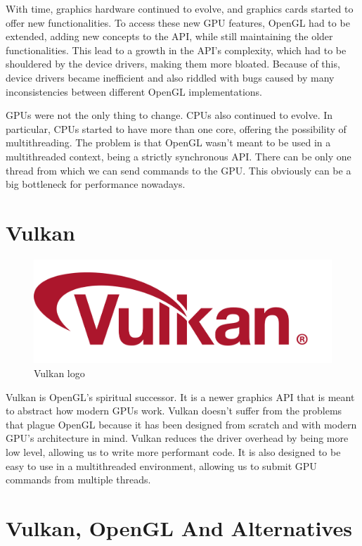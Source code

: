 With time, graphics hardware continued to evolve, and graphics cards started
to offer new functionalities.
To access these new GPU features, OpenGL had to be extended, adding new
concepts to the API, while still maintaining the older functionalities.
This lead to a growth in the API's complexity, which had to be shouldered by
the device drivers, making them more bloated.
Because of this, device drivers became inefficient and also riddled with bugs
caused by many inconsistencies between different OpenGL implementations.

GPUs were not the only thing to change.
CPUs also continued to evolve.
In particular, CPUs started to have more than one core, offering the possibility
of multithreading.
The problem is that OpenGL wasn't meant to be used in a multithreaded context,
being a strictly synchronous API.
There can be only one thread from which we can send commands to the GPU.
This obviously can be a big bottleneck for performance nowadays.

\section{Vulkan}

\begin{figure}[H]
    \centering
    \includegraphics[scale=0.10]{images/ChVulkan/VulkanLogo.png}
    \caption{Vulkan logo}
    \label{fig::VulkanLogo}
\end{figure}

Vulkan is OpenGL's spiritual successor.
It is a newer graphics API that is meant to abstract how modern GPUs work.
Vulkan doesn't suffer from the problems that plague OpenGL because it has been
designed from scratch and with modern GPU's architecture in mind.
Vulkan reduces the driver overhead by being more low level, allowing us to
write more performant code.
It is also designed to be easy to use in a multithreaded environment,
allowing us to submit GPU commands from multiple threads.

\section{Vulkan, OpenGL And Alternatives}

